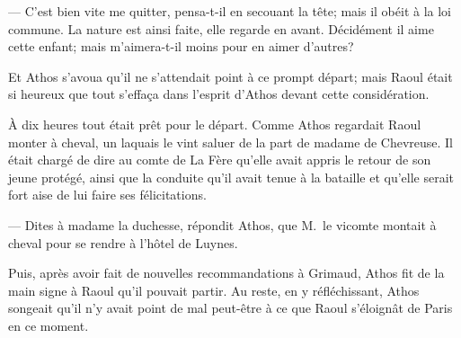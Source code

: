 — C'est bien vite me quitter, pensa-t-il en secouant la tête; mais il obéit à la loi commune. La nature est ainsi faite, elle regarde en avant. Décidément il aime cette enfant; mais m'aimera-t-il moins pour en aimer d'autres?

Et Athos s'avoua qu'il ne s'attendait point à ce prompt départ; mais Raoul était si heureux que tout s'effaça dans l'esprit d'Athos devant cette considération.

À dix heures tout était prêt pour le départ. Comme Athos regardait Raoul monter à cheval, un laquais le vint saluer de la part de madame de Chevreuse. Il était chargé de dire au comte de La Fère qu'elle avait appris le retour de son jeune protégé, ainsi que la conduite qu'il avait tenue à la bataille et qu'elle serait fort aise de lui faire ses félicitations.

— Dites à madame la duchesse, répondit Athos, que M.~le vicomte montait à cheval pour se rendre à l'hôtel de Luynes.

Puis, après avoir fait de nouvelles recommandations à Grimaud, Athos fit de la main signe à Raoul qu'il pouvait partir.
Au reste, en y réfléchissant, Athos songeait qu'il n'y avait point de mal peut-être à ce que Raoul s'éloignât de Paris en ce moment.